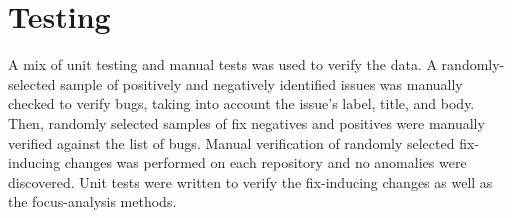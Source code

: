 \section{Testing}

A mix of unit testing and manual tests was used to verify the data. A randomly-selected sample of positively and negatively identified issues was manually checked to verify bugs, taking into account the issue’s label, title, and body. Then, randomly selected samples of fix negatives and positives were manually verified against the list of bugs. Manual verification of randomly selected fix-inducing changes was performed on each repository and no anomalies were discovered. Unit tests were written to verify the fix-inducing changes as well as the focus-analysis methods. 


